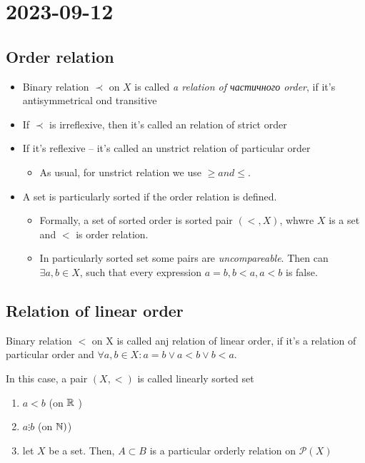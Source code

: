 \section{2023-09-12}

\subsection{Order relation}

\begin{itemize}
	\item \begin{definition}[]
			Binary relation $\prec$ on $X$ is called \textit{a relation of частичного order}, if it's antisymmetrical ond transitive
		\end{definition}
	\item If $\prec$ is irreflexive, then it's called an relation of strict order 
	\item If it's reflexive -- it's called an unstrict relation of particular order 
		\begin{itemize}
			\item As usual, for unstrict relation we use $ \geq and \leq $.
		\end{itemize} 
	\item A set is particularly sorted if the order relation is defined.
	\begin{itemize}
		\item Formally, a set of sorted order is sorted pair $(<, X)$, whwre $X$ is a set and $<$ is order relation.
		\item In particularly sorted set some pairs are \textit{uncompareable}. Then can $\exists a,b \in X$, such that every expression $a = b, b < a, a < b$ is false. 
	\end{itemize} 
\end{itemize}


\subsection{Relation of linear order}

\begin{definition}[]
	Binary relation $<$ on X is called anj relation of linear order, if it's a relation of particular order and  $\forall a,b \in X: a = b \vee a < b \vee b < a$.
\end{definition}

In this case, a pair $(X, <)$ is called linearly sorted set

\begin{example}[]
	\begin{enumerate}
		\item $a < b$ (on $\mathbb{R}$ )
		\item $a \vdots b$ (on $\mathbb{N})$)
		\item let $X$ be a set. Then, $A \subset B$ is a particular orderly relation on $\mathcal{P}(X)$ 
	\end{enumerate}
\end{example}

